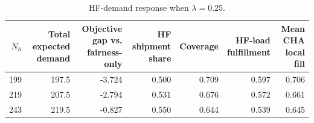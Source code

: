 \begin{table}[!ht]
    \centering
    \small
    \setlength{\tabcolsep}{4pt}
    \renewcommand{\arraystretch}{1.12}
    \caption{HF-demand response when $\lambda=0.25$.}
    \label{tab:hf_demand_summary}
    \begin{tabular}{rrrrrrr}
    \toprule
    $N_h$ & \makecell{Total expected\\demand} & \makecell{Objective gap vs.\\fairness-only} & \makecell{HF shipment\\share} & Coverage & \makecell{HF-load\\fulfillment} & \makecell{Mean CHA\\local fill} \\
    \midrule
    199 & 197.5 & -3.724 & 0.500 & 0.709 & 0.597 & 0.706 \\
    219 & 207.5 & -2.794 & 0.531 & 0.676 & 0.572 & 0.661 \\
    243 & 219.5 & -0.827 & 0.550 & 0.644 & 0.539 & 0.645 \\
    \bottomrule
    \end{tabular}
\end{table}
